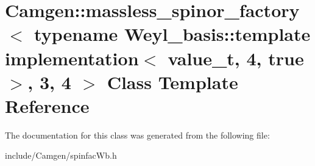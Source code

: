 \hypertarget{a00358}{\section{Camgen\-:\-:massless\-\_\-spinor\-\_\-factory$<$ typename Weyl\-\_\-basis\-:\-:template implementation$<$ value\-\_\-t, 4, true $>$, 3, 4 $>$ Class Template Reference}
\label{a00358}
}


The documentation for this class was generated from the following file\-:\begin{DoxyCompactItemize}
\item 
include/\-Camgen/spinfac\-Wb.\-h\end{DoxyCompactItemize}
